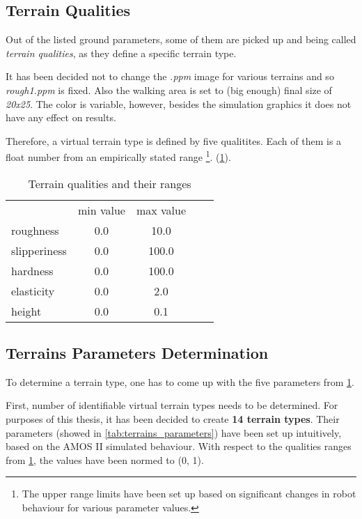 \subsection{Terrain Qualities} \label{ssec:terrain_qualities}
Out of the listed ground parameters, some of them are picked up and being called \textit{terrain qualities}, as they define a specific terrain type.

It has been decided not to change the \textit{.ppm} image for various terrains and so \textit{rough1.ppm} is fixed. Also the walking area is set to (big enough) final size of \textit{20x25}. The color is variable, however, besides the simulation graphics it does not have any effect on results. 

Therefore, a virtual terrain type is defined by five qualitites. Each of them is a float number from an empirically stated range \footnote{The upper range limits have been set up based on significant changes in robot behaviour for various parameter values.}. (\cref{tab:terrain_qualities}).

\begin{table}[H]
\centering
\caption{Terrain qualities and their ranges}
\label{tab:terrain_qualities}
\begin{tabular}{lccll}
             & min value & max value \\
roughness    & 0.0       & 10.0      \\
slipperiness & 0.0       & 100.0     \\
hardness     & 0.0       & 100.0     \\
elasticity   & 0.0       & 2.0       \\
height       & 0.0       & 0.1 
\end{tabular}
\end{table}

\subsection{Terrains Parameters Determination} \label{ssec:terrain_parameters}
To determine a terrain type, one has to come up with the five parameters from \cref{tab:terrain_qualities}.

First, number of identifiable virtual terrain types needs to be determined. For purposes of this thesis, it has been decided to create \textbf{14 terrain types}. Their parameters (showed in \cref{tab:terrains_parameters}) have been set up intuitively, based on the AMOS II simulated behaviour. With respect to the qualities ranges from \cref{tab:terrain_qualities}, the values have been normed to (0, 1).

